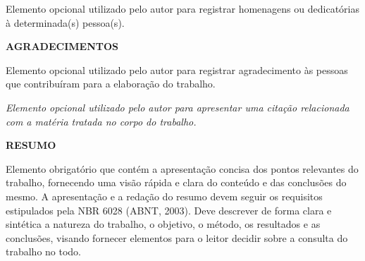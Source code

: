 \documentclass[
	12pt,				%
	oneside,			%
	a4paper,			%
	english,			%
	french,				%
	spanish,			%
	brazil,				%
	]{abntex2}
\theoremstyle{plain}
\theoremstyle{definition}
\begin{document}
\vspace*{\fill}

\begin{dedicatoria}
   \vspace*{10 cm}
   \begin{flushright}
   \begin{minipage}[t]{7cm}
     Elemento opcional utilizado pelo autor para registrar homenagens ou dedicatórias à determinada(s) pessoa(s).
   \end{minipage}
   \end{flushright}
\end{dedicatoria}


\begin{center}
	\textbf{AGRADECIMENTOS}
\end{center}

Elemento opcional utilizado pelo autor para registrar agradecimento às pessoas que contribuíram para a elaboração do trabalho.


\newpage


\vspace*{\fill}

\begin{epigrafe}
    \vspace*{10cm}
	\begin{flushright}
	  \begin{minipage}[t]{7cm}
		\textit{Elemento opcional utilizado pelo autor para apresentar uma citação relacionada com a matéria tratada no corpo do trabalho.}
		
	 \end{minipage}
	\end{flushright}
\end{epigrafe}


\begin{center}
	\textbf{RESUMO}
\end{center}



  \vspace{\onelineskip}

\noindent Elemento obrigatório que contém a apresentação concisa dos pontos relevantes do trabalho, fornecendo uma visão rápida e clara do conteúdo e das conclusões do mesmo. A apresentação e a redação do resumo devem seguir os requisitos estipulados pela NBR 6028 (ABNT, 2003). Deve descrever de forma clara e sintética a natureza do trabalho, o objetivo, o método, os resultados e as conclusões, visando fornecer elementos para o leitor decidir sobre a consulta do trabalho no todo.
\end{document}
